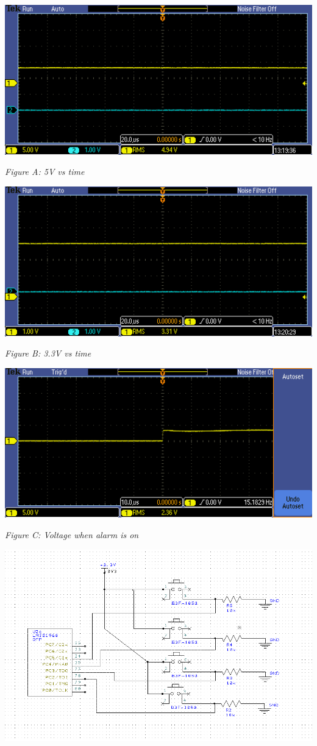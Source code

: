 \documentclass[twoside]{article}
\begin{document}
\includegraphics[width=1\textwidth]{TEK00000}
\centerline{\textit{Figure A: 5V vs time}}
\vskip 0.25in
\includegraphics[width=1\textwidth]{TEK00001}
\centerline{\textit{Figure B: 3.3V vs time}}
\vskip 0.25in
\includegraphics[width=1\textwidth]{TEK00002}
\centerline{\textit{Figure C: Voltage when alarm is on}}
\vskip 0.25in
\includegraphics[width=1\textwidth]{Circuit}
\end{document}
